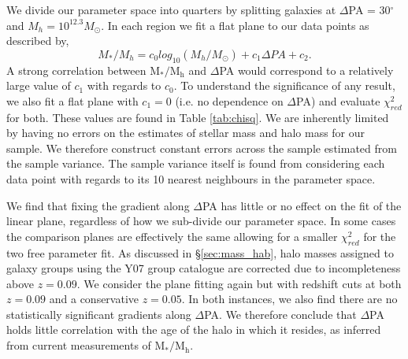 We divide our parameter space into quarters by splitting galaxies at $\Delta$PA = 30$^{\circ}$ and $M_{h} = 10^{12.3}M_{\odot}$. In each region we fit a flat plane to our data points as described by,
\begin{equation}
M_{\ast}/M_{h} = c_{0} log_{10}(M_{h}/M_{\odot}) + c_{1}\Delta PA + c_{2}.
\end{equation}
A strong correlation between $\mathrm{M_{\ast}/M_{h}}$ and $\Delta$PA would correspond to a relatively large value of $c_{1}$ with regards to $c_{0}$. To understand the significance of any result, we also fit a flat plane with $c_{1} = 0$ (i.e. no dependence on $\Delta$PA) and evaluate $\chi_{red}^2$ for both. These values are found in Table \ref{tab:chisq}. We are inherently limited by having no errors on the estimates of stellar mass and halo mass for our sample. We therefore construct constant errors across the sample estimated from the sample variance. The sample variance itself is found from considering each data point with regards to its 10 nearest neighbours in the parameter space. 

We find that fixing the gradient along $\Delta$PA has little or no effect on the fit of the linear plane, regardless of how we sub-divide our parameter space. In some cases the comparison planes are effectively the same allowing for a smaller $\chi_{red}^2$ for the two free parameter fit. As discussed in \S\ref{sec:mass_hab}, halo masses assigned to galaxy groups using the Y07 group catalogue are corrected due to incompleteness above $z=0.09$. We consider the plane fitting again but with redshift cuts at both $z=0.09$ and a conservative $z=0.05$. In both instances, we also find there are no statistically significant gradients along $\Delta$PA. We therefore conclude that $\Delta$PA holds little correlation with the age of the halo in which it resides, as inferred from current measurements of $\mathrm{M_{\ast}/M_{h}}$. 


